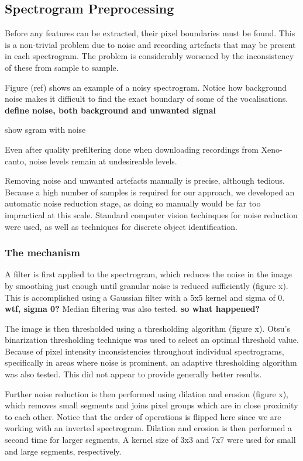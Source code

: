 \subsection{Spectrogram Preprocessing}\label{sec:preproc}

Before any features can be extracted, their pixel boundaries must be found.
This is a non-trivial problem due to noise and recording artefacts
that may be present in each spectrogram.
The problem is considerably worsened by the inconsistency of these from sample
to sample.

Figure (ref) shows an example of a noisy spectrogram.
Notice how background noise makes it difficult to find the exact boundary of
some of the vocalisations.
\textbf{define noise, both background and unwanted signal}

show sgram with noise

Even after quality prefiltering done when downloading recordings from
Xeno-canto, noise levels remain at undesireable levels.

Removing noise and unwanted artefacts manually is precise, although tedious.
Because a high number of samples is required for our approach, we developed an
automatic noise reduction stage, as doing so manually would be far too
impractical at this scale.
Standard computer vision techinques for noise reduction were used, as well as
techniques for discrete object identification.

\subsubsection{The mechanism}
A filter is first applied to the spectrogram, which reduces the noise in the
image by smoothing just enough until granular noise is reduced sufficiently
(figure x).
This is accomplished using a Gaussian filter with a 5x5 kernel and sigma of 0.
\textbf{wtf, sigma 0?}
Median filtering was also tested. \textbf{so what happened?}

The image is then thresholded using a thresholding algorithm (figure x).
Otsu's binarization thresholding technique was used to select an optimal
threshold value.
Because of pixel intensity inconsistencies throughout individual spectrograms,
specifically in areas where noise is prominent, an adaptive thresholding
algorithm was also tested.
This did not appear to provide generally better results.

Further noise reduction is then performed using dilation and erosion (figure x),
which removes small segments and joins pixel groups which are in close proximity
to each other.
Notice that the order of operations is flipped here since we are working with
an inverted spectrogram.
Dilation and erosion is then performed a second time for larger segments,
A kernel size of 3x3 and 7x7 were used for small and large segments, respectively.

